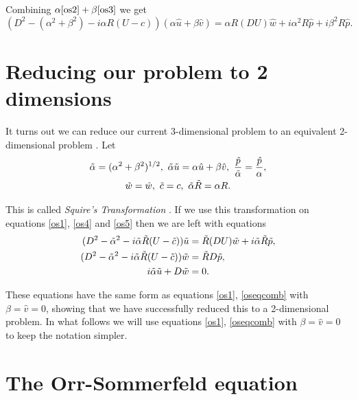 Combining $ \alpha \eqref{os2} + \beta \eqref{os3} $ we get
\begin{equation}
    (D^2 - (\alpha^2+\beta^2) - i \alpha R (U - c)) (\alpha \hat{u} + \beta \hat{v}) = \alpha R (DU) \hat{w} + i \alpha^2 R \hat{p} + i \beta^2 R \hat{p}.
\label{os5}
\end{equation}

\section{Reducing our problem to 2 dimensions}

It turns out we can reduce our current 3-dimensional problem to an equivalent 2-dimensional problem \citep{drazin2004hydrodynamic}. Let
\begin{gather}
    \Tilde{\alpha} = (\alpha^2 + \beta^2)^{1/2},\ \Tilde{\alpha} \Tilde{u} = \alpha \hat{u} + \beta \hat{v},\ \frac{\Tilde{p}}{\Tilde{\alpha}} = \frac{\hat{p}}{\alpha}, \nonumber\\ \Tilde{w} = \hat{w},\ \Tilde{c} = c,\ \Tilde{\alpha} \Tilde{R} = \alpha R.
\end{gather}

This is called \emph{Squire's Transformation} \citep{squire1933stability}. If we use this transformation on equations \eqref{os1}, \eqref{os4} and \eqref{os5} then we are left with equations
\begin{subequations}
\begin{align}
    (D^2 - \Tilde{\alpha}^2 - i \Tilde{\alpha} \Tilde{R} (U - \Tilde{c}))  \Tilde{u} &= \Tilde{R} (DU) \Tilde{w} + i \Tilde{\alpha} \Tilde{R} \Tilde{p}, \label{os2d1} \\
    (D^2 - \Tilde{\alpha}^2 - i \Tilde{\alpha} \Tilde{R} (U - \Tilde{c})) \Tilde{w} &= \Tilde{R} D \Tilde{p}, \label{os2d2} \\
    i \Tilde{\alpha} \Tilde{u} + D \Tilde{w} &= 0. \label{os2d3}
\end{align} \label{equationstoreduce}
\end{subequations}

These equations have the same form as equations \eqref{os1}, \eqref{oseqcomb} with $ \beta = \hat{v} = 0 $, showing that we have successfully reduced this to a 2-dimensional problem. In what follows we will use equations \eqref{os1}, \eqref{oseqcomb} with $ \beta = \hat{v} = 0$ to keep the notation simpler.

\section{The Orr-Sommerfeld equation}

